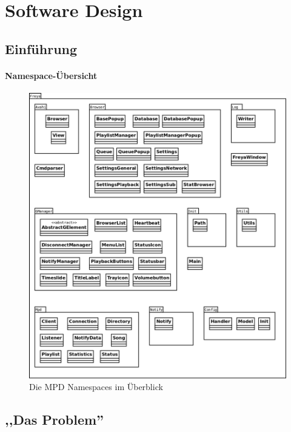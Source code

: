 
\chapter{Software Design}

\section{Einführung}

\subsubsection{Namespace-Übersicht}

\begin{figure}[h!]
    \centering
    \includegraphics[scale=0.21]{Namespace_Uebersicht.png}
    \caption{Die MPD Namespaces im Überblick}
    \label{dd_namespaces}
\end{figure}

\section{,,Das Problem''}

